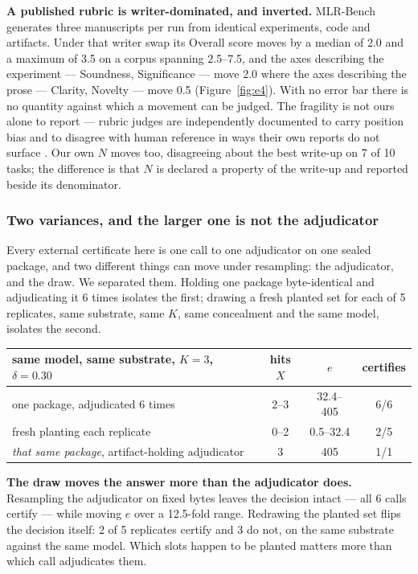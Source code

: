 \documentclass[10pt]{article}
\newcommand{\RM}[1]{{#1}}
\begin{document}
\textbf{A published rubric is writer-dominated, and inverted.} MLR-Bench
generates three manuscripts per run from identical experiments, code and
artifacts. Under that writer swap its Overall score moves by a median of
\RM{2.0} and a maximum of \RM{3.5} on a corpus spanning 2.5--7.5, and
the axes describing the experiment --- Soundness, Significance --- move
\RM{2.0} where the axes describing the prose --- Clarity, Novelty --- move
\RM{0.5} (Figure~\ref{fig:e4}). With no error bar there is no quantity against
which a movement can be judged. The fragility is not ours alone to report --- rubric
judges are independently documented to carry position bias \cite{more2026} and
to disagree with human reference in ways their own reports do not surface
\cite{when2026}. Our own $N$ moves too, disagreeing about the best
write-up on \RM{7} of \RM{10} tasks; the difference is that $N$ is declared a
property of the write-up and reported beside its denominator.

\subsubsection{Two variances, and the larger one is not the adjudicator}
\label{sec:variance}
Every external certificate here is one call to one adjudicator on one sealed
package, and two different things can move under resampling: the adjudicator,
and the draw. We separated them. Holding one package byte-identical and
adjudicating it \RM{6} times isolates the first; drawing a fresh planted set for
each of \RM{5} replicates, same substrate, same $K$, same concealment and the
same model, isolates the second.

\begin{center}
\small
\begin{tabular}{@{}lccc@{}}
\toprule
same model, same substrate, $K=\RM{3}$, $\delta=\RM{0.30}$ & hits $X$ & $e$ & certifies \\
\midrule
one package, adjudicated \RM{6} times   & \RM{2}--\RM{3} & \RM{32.4}--\RM{405} & \RM{6/6} \\
fresh planting each replicate           & \RM{0}--\RM{2} & \RM{0.5}--\RM{32.4}  & \RM{2/5} \\
\midrule
\emph{that same package}, artifact-holding adjudicator & \RM{3} & \RM{405} & \RM{1/1} \\
\bottomrule
\end{tabular}
\end{center}

\noindent \textbf{The draw moves the answer more than the adjudicator does.}
Resampling the adjudicator on fixed bytes leaves the decision intact --- all
\RM{6} calls certify --- while moving $e$ over a \RM{12.5}-fold range. Redrawing
the planted set flips the decision itself: \RM{2} of \RM{5} replicates certify
and \RM{3} do not, on the same substrate against the same model. Which slots
happen to be planted matters more than which call adjudicates them.
\end{document}
